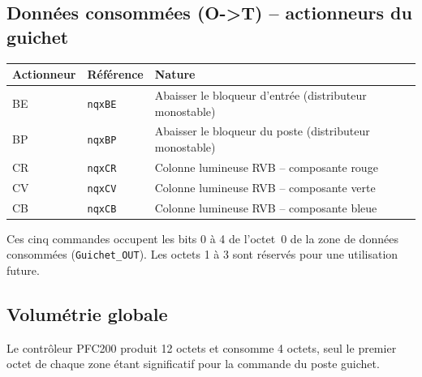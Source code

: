 \subsection{Données consommées (O->T) -- actionneurs du guichet}

\begin{center}
\begin{tabular}{|l|l|p{7cm}|}
\hline
\textbf{Actionneur} & \textbf{Référence} & \textbf{Nature} \\
\hline
BE & \texttt{nqxBE} & Abaisser le bloqueur d'entrée (distributeur
monostable) \\
\hline
BP & \texttt{nqxBP} & Abaisser le bloqueur du poste (distributeur
monostable) \\
\hline
CR & \texttt{nqxCR} & Colonne lumineuse RVB -- composante rouge \\
\hline
CV & \texttt{nqxCV} & Colonne lumineuse RVB -- composante verte \\
\hline
CB & \texttt{nqxCB} & Colonne lumineuse RVB -- composante bleue \\
\hline
\end{tabular}
\end{center}

Ces cinq commandes occupent les bits 0 à 4 de l'octet~0 de la zone de
données consommées (\texttt{Guichet\_OUT}). Les octets 1 à 3 sont réservés
pour une utilisation future.


\subsection{Volumétrie globale}

Le contrôleur PFC200 produit 12 octets et consomme 4 octets, seul le
premier octet de chaque zone étant significatif pour la commande du poste
guichet.
